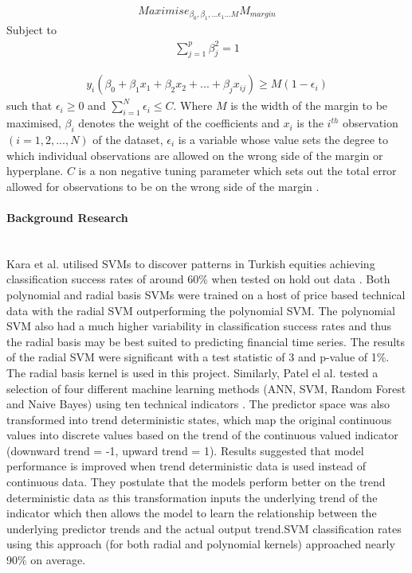 \documentclass[11pt]{article}
\newcommand{\myparagraph}[1]{\paragraph{#1}\mbox{}\\}
\begin{document}
\begin{align}
Maximise_{\beta_{0}, \beta_{1},...\epsilon_{1}...M}  M_{margin} 
\end{align}
Subject to 
\begin{align}
\sum^{p}_{j=1} \beta^{2}_{j} = 1
\end{align}

\begin{align}
y_{i}( \beta_{0} + \beta_{1}x_{1} + \beta_{2}x_{2} +...+ \beta_{j}x_{ij}) \geq M(1- \epsilon_{i})
\end{align}
such that $ \epsilon_{i} \geq 0$ and $ \sum^{N}_{i = 1} \epsilon_{i} \leq C$. Where $M$ is the width of the margin to be maximised, $ \beta_{i}$ denotes the weight of the coefficients and $x_{i}$ is the $i^{th}$ observation $(i = 1,2,...,N)$ of the dataset, $\epsilon_{i}$ is a variable whose value sets the degree to which individual observations are allowed on the wrong side of the margin or hyperplane. $C$ is a non negative tuning parameter which sets out the total error allowed for observations to be on the wrong side of the margin \cite{James2013}. 
\myparagraph{Background Research}
 Kara et al. utilised SVMs to discover patterns in Turkish equities achieving classification success rates of around 60\% when tested on hold out data \cite{Kara2011}. Both polynomial and radial basis SVMs were trained on a host of price based technical data with the radial SVM outperforming the polynomial SVM. The polynomial SVM also had a much higher variability in classification success rates and thus the radial basis may be best suited to predicting financial time series. The results of the radial SVM were significant with a test statistic of 3 and p-value of 1\%. The radial basis kernel is used in this project.
\newline Similarly, Patel el al. tested a selection of four different machine learning methods (ANN, SVM, Random Forest and Naive Bayes) using ten technical indicators \cite{Patel2015}. The predictor space was also transformed into trend deterministic states, which map the original continuous values into discrete values based on the trend of the continuous valued indicator (downward trend = -1, upward trend = 1). Results suggested that model performance is improved when trend deterministic data is used instead of continuous data. They postulate that the models perform better on the trend deterministic data as this transformation inputs the underlying trend of the indicator which then allows the model to learn the relationship between the underlying predictor trends and the actual output trend.\newline SVM classification rates using this approach (for both radial and polynomial kernels) approached nearly 90\% on average.
\end{document}

